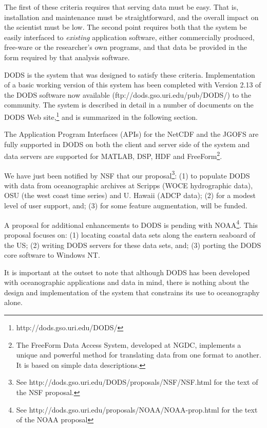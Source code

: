 \documentclass[12pt]{article}
\begin{document}
The first of these criteria requires that serving data must be
easy. That is, installation and
maintenance must be straightforward, and the overall impact on the
scientist must be low. The second point requires both that the system
be easily interfaced to {\em existing} application software, either
commercially produced, free-ware or the researcher's own programs, and
that data be provided in the form required by that analysis software.

\ac{DODS} is the system that was designed to satisfy these criteria.
Implementation of a basic working version of this system has been
completed with Version 2.13 of the \ac{DODS} software now available 
(ftp://dods.gso.uri.edu/pub/DODS/) to the community. The system is 
described in detail in a number of documents on the \ac{DODS} Web 
site,\footnote{http://dods.gso.uri.edu/DODS/} and is summarized in 
the following section.

The Application Program Interfaces (\acs{API}s) for the \ac{NetCDF} and 
the \ac{JGOFS} are fully supported in \ac{DODS} on both the
client and server side of the system and data servers are supported for
\acl{MATLAB}, DSP, \acs{HDF} and FreeForm\footnote{The FreeForm Data
Access System, developed at NGDC, implements a unique and powerful method 
for translating data from one format to another. It is based on simple 
data descriptions.}.

We have just been notified by \acs{NSF} that our proposal\footnote{See
http://dods.gso.uri.edu/DODS/proposals/NSF/NSF.html for the text of 
the \acs{NSF} proposal.}: (1) to populate
\ac{DODS} with data from oceanographic archives at Scripps (\ac{WOCE}
hydrographic data), \ac{OSU} (the west coast time series) and U. Hawaii
(\ac{ADCP} data); (2) for a modest level of user support, and; (3) for some
feature augmentation, will be funded.

A proposal for additional enhancements to \ac{DODS} is pending with 
\ac{NOAA}\footnote{See http://dods.gso.uri.edu/proposals/NOAA/NOAA-prop.html
for the text of the \ac{NOAA} proposal}. 
This proposal focuses on: (1) locating coastal data sets along the 
eastern seaboard of the US; (2) writing \ac{DODS} servers for these 
data sets, and; (3) porting the \ac{DODS} core software to Windows NT. 

It is important at the outset to note that although \ac{DODS} has been
developed with oceanographic applications and data in mind, there is
nothing about the design and implementation of the system that
constrains its use to oceanography alone.
\end{document}
